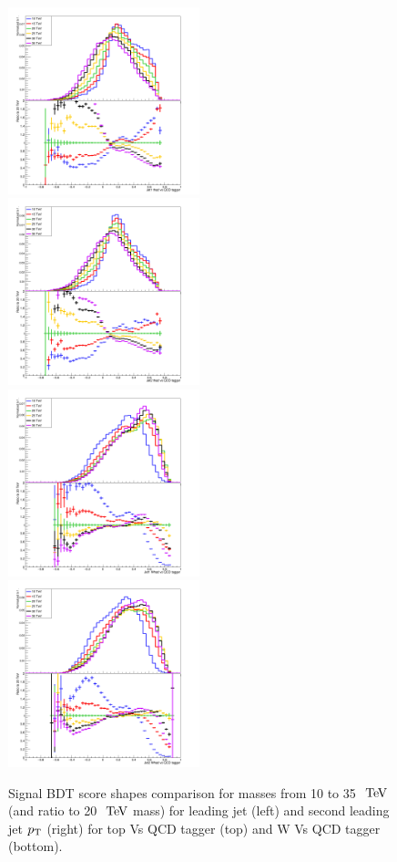 \documentclass{cernrep}
\begin{document}
\begin{figure}[!htb]\centering
\includegraphics[width=0.495\textwidth]{Fig/TMVA/Jet1_thad_vs_QCD_tagger.png}
\includegraphics[width=0.495\textwidth]{Fig/TMVA/Jet2_thad_vs_QCD_tagger.png}
\includegraphics[width=0.495\textwidth]{Fig/TMVA/Jet1_Whad_vs_QCD_tagger.png}
\includegraphics[width=0.495\textwidth]{Fig/TMVA/Jet2_Whad_vs_QCD_tagger.png}
\caption{Signal BDT score shapes comparison for masses from 10 to 35 $\TeV$ (and ratio to 20 $\TeV$ mass) for leading jet (left) and second leading jet $p_{\text{T}}$ (right) for top Vs QCD tagger (top) and W Vs QCD tagger (bottom).}
\label{fig:BDT_signal_shape_comparison}
\end{figure}
\end{document}
